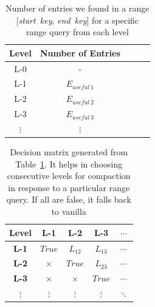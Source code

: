 
\begin{table}
    \begin{tabular}{|c|c|c|c|c|}
        \hline
        \textbf{Level} & \textbf{Number of Entries} \\
        \hline
        L-0 & \-- \\
        \hline
        L-1 & \textit{$E_{useful\ 1}$} \\
        \hline
        L-2 & \textit{$E_{useful\ 2}$} \\
        \hline
        L-3 & \textit{$E_{useful\ 3}$} \\
        \hline
        $\vdots$ & $\vdots$ \\
        \hline
    \end{tabular}
    \caption{Number of entries we found in a range [\textit{start\ key}, \textit{end\ key}] for a specific range query from each level}
    \label{table:decision-making-meta-data}
\end{table}

\begin{table}
    \begin{tabular}{ |c|c|c|c|c| }
        \hline
        \hspace*{4.1mm}\textbf{Level}\hspace*{4.1mm} & \hspace*{4.1mm}\textbf{L-1}\hspace*{4.1mm} & \hspace*{4.1mm}\textbf{L-2}\hspace*{4.1mm} & \hspace*{4.1mm}\textbf{L-3}\hspace*{4.1mm} & \hspace*{4mm}$\cdots$\hspace*{4mm} \\
        \hline
        \textbf{L-1} & $True$ & $L_{12}$ & $L_{13}$ & $\cdots$ \\
        \hline
        \textbf{L-2} & $\times$ & $True$ & $L_{23}$ & $\cdots$ \\
        \hline
        \textbf{L-3} &  $\times$ &  $\times$ & $True$ & $\cdots$ \\
        \hline
        $\vdots$ &  $\vdots$ &  $\vdots$ & $\vdots$ & $\ddots$ \\
        \hline
    \end{tabular}
    \caption{Decision matrix generated from Table~\ref{table:decision-making-meta-data}. It helps in choosing consecutive levels for compaction in response to a particular range query. If all are false, it falls back to vanilla}
    \label{table:decision-matrix}
\end{table}

